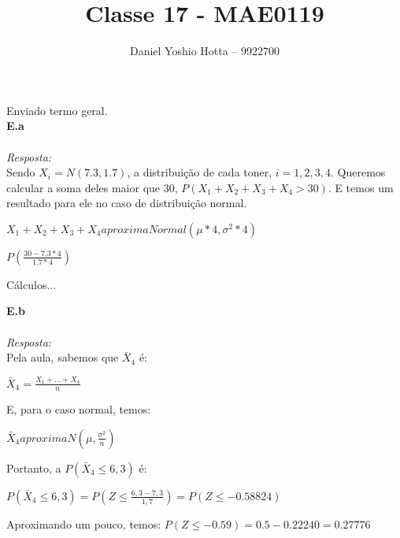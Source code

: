 \documentclass{article}
\begin{document}
	
	\title{Classe 17 - MAE0119}
	\author{Daniel Yoshio Hotta – 9922700}
	
	\maketitle	
	
	Enviado termo geral.\\
	
	\textbf {E.a} 
	\\ \\
	\textit {Resposta:} \\
    
    Sendo $X_i = N (7.3, 1.7)$, a distribuição de cada toner, $i = {1,2,3,4}$. Queremos calcular a soma deles maior que 30, $P (X_1 + X_2 + X_3 + X_4 > 30) $. E temos um resultado para ele no caso de distribuição normal.
    
    \begin{center}
    	$X_1 + X_2 + X_3 + X_4 aproxima Normal (\mu * 4, \sigma ^ 2 *4) $
    \end{center}

    $P (\frac {30 - 7.3 * 4}{1.7 * 4 })$

    Cálculos...

    \textbf {E.b} 
    \\ \\
    \textit {Resposta:} \\
    
    Pela aula, sabemos que $\bar{X}_4$ é:
    
    \begin{center}
    	$\bar{X}_4 = \frac{X_1 + ... + X_4}{n}$
    \end{center}

    E, para o caso normal, temos:
    
    \begin{center}
    	$\bar{X}_4 aproxima  N (\mu, \frac{\sigma ^2}{n})$
    \end{center}

    Portanto, a $P (\bar{X}_4 \leq 6,3)$ é:
    
    \begin{center}
    	$P (\bar{X}_4 \leq 6,3) = P (Z \leq \frac{6,3 - 7,3}{1,7}) = P (Z \leq -0.58824)$
    \end{center}

    Aproximando um pouco, temos: $P(Z \leq -0.59) = 0.5 - 0.22240 = 0.27776$
\end{document}
